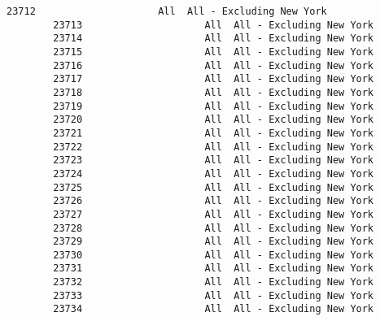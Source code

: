 \documentclass[11pt]{article}
\begin{document}
\begin{Verbatim}[commandchars=\\\{\}]
        23712                     All  All - Excluding New York   
        23713                     All  All - Excluding New York   
        23714                     All  All - Excluding New York   
        23715                     All  All - Excluding New York   
        23716                     All  All - Excluding New York   
        23717                     All  All - Excluding New York   
        23718                     All  All - Excluding New York   
        23719                     All  All - Excluding New York   
        23720                     All  All - Excluding New York   
        23721                     All  All - Excluding New York   
        23722                     All  All - Excluding New York   
        23723                     All  All - Excluding New York   
        23724                     All  All - Excluding New York   
        23725                     All  All - Excluding New York   
        23726                     All  All - Excluding New York   
        23727                     All  All - Excluding New York   
        23728                     All  All - Excluding New York   
        23729                     All  All - Excluding New York   
        23730                     All  All - Excluding New York   
        23731                     All  All - Excluding New York   
        23732                     All  All - Excluding New York   
        23733                     All  All - Excluding New York   
        23734                     All  All - Excluding New York   
        

\end{Verbatim}
\end{document}
